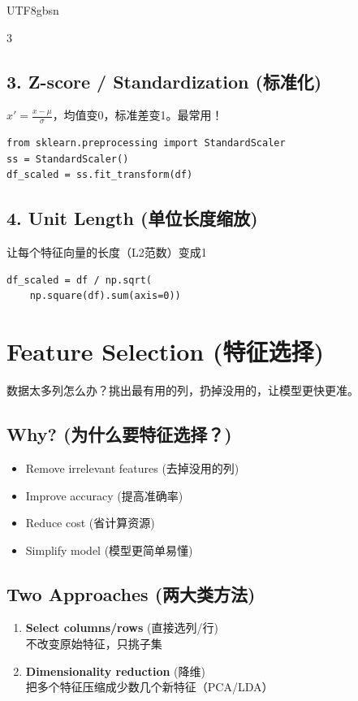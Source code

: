 \documentclass[10pt,landscape,a4paper]{article}
\newcommand{\zhint}[1]{{\scriptsize\color{gray!70!black}#1}}
\begin{document}
\begin{CJK}{UTF8}{gbsn}
\begin{multicols}{3}
\subsection{3. Z-score / Standardization \zhint{(标准化)}}
\zhint{$x' = \frac{x - \mu}{\sigma}$，均值变0，标准差变1。最常用！}
\begin{lstlisting}
from sklearn.preprocessing import StandardScaler
ss = StandardScaler()
df_scaled = ss.fit_transform(df)
\end{lstlisting}

\subsection{4. Unit Length \zhint{(单位长度缩放)}}
\zhint{让每个特征向量的长度（L2范数）变成1}
\begin{lstlisting}
df_scaled = df / np.sqrt(
    np.square(df).sum(axis=0))
\end{lstlisting}

\section{Feature Selection \zhint{(特征选择)}}

\zhint{数据太多列怎么办？挑出最有用的列，扔掉没用的，让模型更快更准。}

\subsection{Why? \zhint{(为什么要特征选择？)}}
\begin{itemize}[leftmargin=*, nosep, itemsep=0pt]
    \item Remove irrelevant features \zhint{(去掉没用的列)}
    \item Improve accuracy \zhint{(提高准确率)}
    \item Reduce cost \zhint{(省计算资源)}
    \item Simplify model \zhint{(模型更简单易懂)}
\end{itemize}

\subsection{Two Approaches \zhint{(两大类方法)}}
\begin{enumerate}[leftmargin=*, nosep, itemsep=1pt]
    \item \textbf{Select columns/rows} \zhint{(直接选列/行)}\\
    \zhint{不改变原始特征，只挑子集}
    \item \textbf{Dimensionality reduction} \zhint{(降维)}\\
    \zhint{把多个特征压缩成少数几个新特征（PCA/LDA）}
\end{enumerate}


\end{multicols}
\end{CJK}
\end{document}
